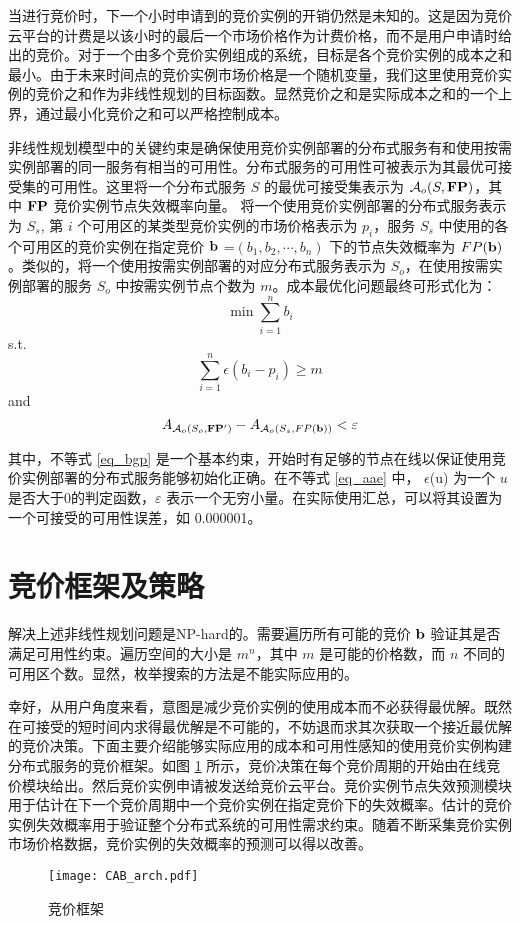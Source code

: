 当进行竞价时，下一个小时申请到的竞价实例的开销仍然是未知的。这是因为竞价云平台的计费是以该小时的最后一个市场价格作为计费价格，而不是用户申请时给出的竞价。对于一个由多个竞价实例组成的系统，目标是各个竞价实例的成本之和最小。由于未来时间点的竞价实例市场价格是一个随机变量，我们这里使用竞价实例的竞价之和作为非线性规划的目标函数。显然竞价之和是实际成本之和的一个上界，通过最小化竞价之和可以严格控制成本。

非线性规划模型中的关键约束是确保使用竞价实例部署的分布式服务有和使用按需实例部署的同一服务有相当的可用性。分布式服务的可用性可被表示为其最优可接受集的可用性。这里将一个分布式服务 $S$ 的最优可接受集表示为 $\mathcal{A}_{o}(S, \bf{FP})$，其中 $\bf{FP}$ 竞价实例节点失效概率向量。 将一个使用竞价实例部署的分布式服务表示为 $S_s$, 第 $i$ 个可用区的某类型竞价实例的市场价格表示为 $p_i$，服务 $S_s$ 中使用的各个可用区的竞价实例在指定竞价 $\bf b$ =$ (b_1, b_2, \cdots, b_n)$ 下的节点失效概率为 $FP(\bf b)$。类似的，将一个使用按需实例部署的对应分布式服务表示为 $S_o$，在使用按需实例部署的服务 $S_o$ 中按需实例节点个数为 $m$。成本最优化问题最终可形式化为：
\begin{equation}
\min \sum_{i=1}^n b_i
\end{equation}
s.t.
\begin{equation}\label{eq_bgp}
\sum_{i=1}^n {\epsilon(b_i - p_i)} \geq m
\end{equation}
and
\begin{equation}\label{eq_aae}
A_{\mathcal{A}_{o}(S_o, {\bf{FP^{\prime}}})} - A_{\mathcal{A}_{o}(S_s, FP(\bf b))} < \varepsilon
\end{equation}

其中，不等式 \eqref{eq_bgp} 是一个基本约束，开始时有足够的节点在线以保证使用竞价实例部署的分布式服务能够初始化正确。在不等式 \eqref{eq_aae} 中， $\epsilon$(u) 为一个 $u$ 是否大于0的判定函数，$\varepsilon$ 表示一个无穷小量。在实际使用汇总，可以将其设置为一个可接受的可用性误差，如 0.000001。

\section{竞价框架及策略}
\label{jupiter-framework}
解决上述非线性规划问题是NP-hard的。需要遍历所有可能的竞价 $\bf b$ 验证其是否满足可用性约束。遍历空间的大小是 $m^n$，其中 $m$ 是可能的价格数，而 $n$ 不同的可用区个数。显然，枚举搜索的方法是不能实际应用的。

幸好，从用户角度来看，意图是减少竞价实例的使用成本而不必获得最优解。既然在可接受的短时间内求得最优解是不可能的，不妨退而求其次获取一个接近最优解的竞价决策。下面主要介绍能够实际应用的成本和可用性感知的使用竞价实例构建分布式服务的竞价框架。如图 \ref{figure:framework} 所示，竞价决策在每个竞价周期的开始由在线竞价模块给出。然后竞价实例申请被发送给竞价云平台。竞价实例节点失效预测模块用于估计在下一个竞价周期中一个竞价实例在指定竞价下的失效概率。估计的竞价实例失效概率用于验证整个分布式系统的可用性需求约束。随着不断采集竞价实例市场价格数据，竞价实例的失效概率的预测可以得以改善。
\begin{figure}
  \centering
  \texttt{[image: CAB\_arch.pdf]}
  \caption{竞价框架}
  \label{figure:framework}
\end{figure}

